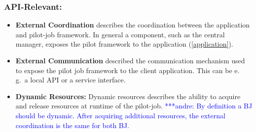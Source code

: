 \documentclass[]{article}
\newcommand{\alnote}[1]{ {\textcolor{blue} { ***andre: #1 }}}
\newcommand{\alnote}[1]{}
\begin{document}
\subsubsection{API-Relevant:}
\begin{itemize}

    \item \textbf{External Coordination} describes the coordination between 
	 the application and pilot-job framework. In general a component, such 
	 as the central manager, exposes the pilot framework to the  application 
	 (\ref{application}). 
	 

	\item \textbf{External Communication} described the communication mechanism 
	used to expose the pilot job framework to the client application.  This can 
	be e.\,g.\ a local API or a service interface.
	
	\item \textbf{Dynamic Resources:} Dynamic resources describes the ability 
	to acquire and release resources at runtime of the pilot-job.
	    \alnote{By definition a BJ should be dynamic. After acquiring additional 
	    resources, the external coordination is the same for both BJ.}


\end{itemize}
\end{document}

